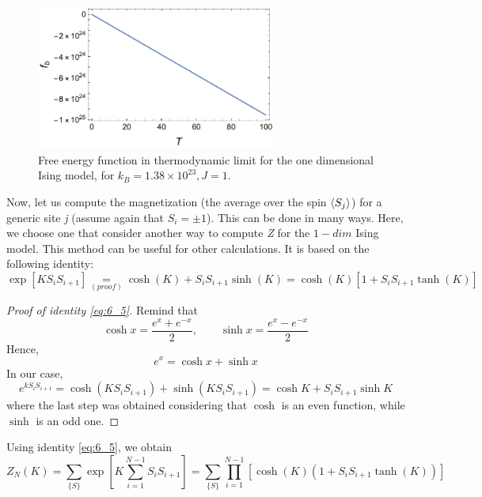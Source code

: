 \documentclass[../../Main/Main.tex]{subfiles}
\begin{document}
\begin{figure}[h!]
\centering
\includegraphics[width=0.7\textwidth]{./img/3__1.pdf}
\caption{\label{fig:6_3} Free energy function in thermodynamic limit for the one dimensional Ising model, for \( k_B = 1.38 \times 10^{23}, J=1\). }
\end{figure}
Now, let us compute the magnetization (the average over the spin \( \expval{S_j}  \)) for a generic site \emph{j} (assume again that \( S_i = \pm 1 \)). This can be done in many ways. Here, we choose one that consider another way to compute \emph{Z} for the \( 1-dim \) Ising model. This method can be useful for other calculations. It is based on the following identity:
\begin{equation}
  \exp [ K S_i S_{i+1}] \underset{(proof)}{=}  \cosh ( K) + S_i S_{i+1} \sinh (K) = \cosh (K) [1+ S_i S_{i+1} \tanh (K)]
  \label{eq:6_5}
\end{equation}
\begin{proof}[Proof of identity \eqref{eq:6_5}]
Remind that 
\begin{equation*}
\cosh x = \frac{e^x + e ^{-x} }{2}, \qquad \sinh x = \frac{e^x - e ^{-x} }{2}
\end{equation*}
Hence, 
\begin{equation*}
    e^x = \cosh{x} + \sinh{x}
\end{equation*}
In our case, 
\begin{equation*}
 e^{k S_i S_{i+1}} = \cosh (K S_i S_{i+1}) +     \sinh (K S_i S_{i+1})
 = \cosh K + S_i S_{i+1} \sinh K 
\end{equation*}
where the last step was obtained considering that \( \cosh \) is an even function, while \( \sinh \) is an odd one.
\end{proof}
Using identity \eqref{eq:6_5}, we obtain
\begin{equation*}
  Z_N (K) = \sum_{\{ S \}  }^{}    \exp [K  \sum_{i=1}^{N-1} S_i S_{i+1}  ] = \sum_{\{ S \}  }^{}   \prod_{i=1}^{N-1} [ \cosh (K) (1+ S_i S_{i+1} \tanh (K))]
\end{equation*}
\end{document}
